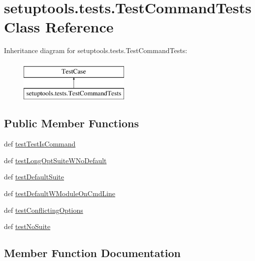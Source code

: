 \hypertarget{classsetuptools_1_1tests_1_1TestCommandTests}{}\section{setuptools.\+tests.\+Test\+Command\+Tests Class Reference}
\label{classsetuptools_1_1tests_1_1TestCommandTests}
Inheritance diagram for setuptools.\+tests.\+Test\+Command\+Tests\+:\begin{figure}[H]
\begin{center}
\leavevmode
\includegraphics[height=2.000000cm]{classsetuptools_1_1tests_1_1TestCommandTests}
\end{center}
\end{figure}
\subsection*{Public Member Functions}
\begin{DoxyCompactItemize}
\item 
def \hyperlink{classsetuptools_1_1tests_1_1TestCommandTests_a97d95548ecd5cf1306eb68282bafbd02}{test\+Test\+Is\+Command}
\item 
def \hyperlink{classsetuptools_1_1tests_1_1TestCommandTests_a612994ff79bb6de7c62e60d1b8ff42a7}{test\+Long\+Opt\+Suite\+W\+No\+Default}
\item 
def \hyperlink{classsetuptools_1_1tests_1_1TestCommandTests_a4abeaf548d79491cf0c228b6f3cea6a5}{test\+Default\+Suite}
\item 
def \hyperlink{classsetuptools_1_1tests_1_1TestCommandTests_aed58d62aef9f105fa0aaf55c79e55bf3}{test\+Default\+W\+Module\+On\+Cmd\+Line}
\item 
def \hyperlink{classsetuptools_1_1tests_1_1TestCommandTests_af8020e51331e9e955fdacc7c48bfd8dd}{test\+Conflicting\+Options}
\item 
def \hyperlink{classsetuptools_1_1tests_1_1TestCommandTests_ac38ab1b5162952fb2d2f964cfa65520d}{test\+No\+Suite}
\end{DoxyCompactItemize}


\subsection{Member Function Documentation}
\hypertarget{classsetuptools_1_1tests_1_1TestCommandTests_af8020e51331e9e955fdacc7c48bfd8dd}{}
